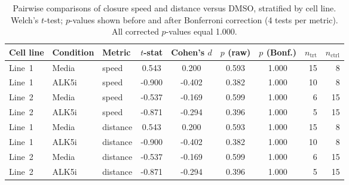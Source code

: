 \begin{table}[H]
\centering
\caption{Pairwise comparisons of closure speed and distance versus DMSO,
  stratified by cell line.
  Welch's $t$-test; $p$-values shown before and after Bonferroni correction
  (4 tests per metric).
  All corrected $p$-values equal 1.000.}
\label{tab:supp-pairwise}
\small
\begin{tabular}{lll
  S[table-format=1.3]
  S[table-format=-1.3]
  S[table-format=1.3]
  S[table-format=1.3]
  rr}
\toprule
{Cell line} & {Condition} & {Metric}
  & {$t$-stat}
  & {Cohen's $d$}
  & {$p$ (raw)}
  & {$p$ (Bonf.)}
  & {$n_\text{trt}$}
  & {$n_\text{ctrl}$} \\
\midrule
Line~1 & Media & speed    &  0.543 &  0.200 & 0.593 & 1.000 & 15 & 8 \\
Line~1 & ALK5i & speed    & -0.900 & -0.402 & 0.382 & 1.000 & 10 & 8 \\
Line~2 & Media & speed    & -0.537 & -0.169 & 0.599 & 1.000 &  6 & 15 \\
Line~2 & ALK5i & speed    & -0.871 & -0.294 & 0.396 & 1.000 &  5 & 15 \\
Line~1 & Media & distance &  0.543 &  0.200 & 0.593 & 1.000 & 15 & 8 \\
Line~1 & ALK5i & distance & -0.900 & -0.402 & 0.382 & 1.000 & 10 & 8 \\
Line~2 & Media & distance & -0.537 & -0.169 & 0.599 & 1.000 &  6 & 15 \\
Line~2 & ALK5i & distance & -0.871 & -0.294 & 0.396 & 1.000 &  5 & 15 \\
\bottomrule
\end{tabular}
\end{table}

